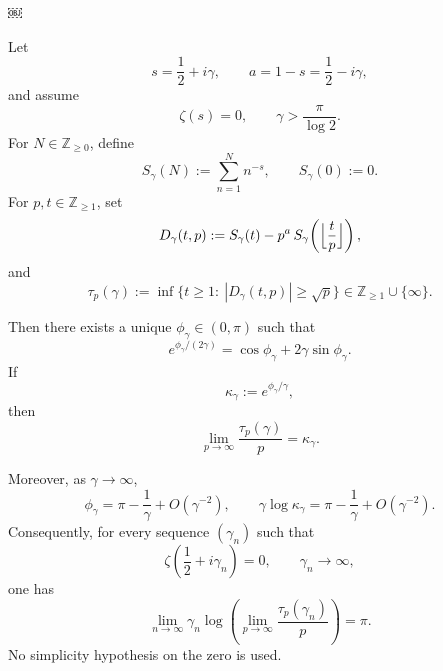 ￼

\begin{theorem}
Let
\[
s=\frac12+i\gamma,\qquad a=1-s=\frac12-i\gamma,
\]
and assume
\[
\zeta(s)=0,\qquad \gamma>\frac{\pi}{\log 2}.
\]
For \(N\in\mathbb Z_{\ge 0}\), define
\[
S_\gamma(N):=\sum_{n=1}^N n^{-s},\qquad S_\gamma(0):=0.
\]
For \(p,t\in\mathbb Z_{\ge 1}\), set
\[
D_\gamma(t,p):=S_\gamma(t)-p^a\,S_\gamma\!\left(\Bigl\lfloor \frac{t}{p}\Bigr\rfloor\right),
\]
and
\[
\tau_p(\gamma):=\inf\{t\ge 1:\ |D_\gamma(t,p)|\ge \sqrt p\}\in \mathbb Z_{\ge 1}\cup\{\infty\}.
\]

Then there exists a unique \(\phi_\gamma\in(0,\pi)\) such that
\[
e^{\phi_\gamma/(2\gamma)}=\cos\phi_\gamma+2\gamma\sin\phi_\gamma.
\]
If
\[
\kappa_\gamma:=e^{\phi_\gamma/\gamma},
\]
then
\[
\lim_{p\to\infty}\frac{\tau_p(\gamma)}{p}=\kappa_\gamma.
\]

Moreover, as \(\gamma\to\infty\),
\[
\phi_\gamma=\pi-\frac1\gamma+O(\gamma^{-2}),
\qquad
\gamma\log \kappa_\gamma=\pi-\frac1\gamma+O(\gamma^{-2}).
\]
Consequently, for every sequence \((\gamma_n)\) such that
\[
\zeta\!\left(\frac12+i\gamma_n\right)=0,\qquad \gamma_n\to\infty,
\]
one has
\[
\lim_{n\to\infty}\gamma_n\log\!\left(\lim_{p\to\infty}\frac{\tau_p(\gamma_n)}{p}\right)=\pi.
\]
No simplicity hypothesis on the zero is used.
\end{theorem}

